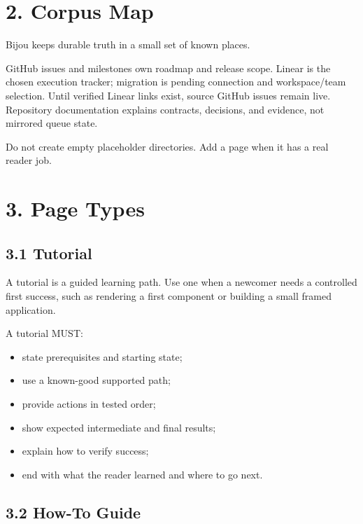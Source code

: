 \section{2. Corpus Map}\label{record-005-corpus-map}

Bijou keeps durable truth in a small set of known places.



GitHub issues and milestones own roadmap and release scope. Linear is the chosen execution tracker; migration is pending connection and workspace/team selection. Until verified Linear links exist, source GitHub issues remain live. Repository documentation explains contracts, decisions, and evidence, not mirrored queue state.

Do not create empty placeholder directories. Add a page when it has a real reader job.

\section{3. Page Types}\label{record-005-page-types}

\subsection{3.1 Tutorial}\label{record-005-tutorial}

A tutorial is a guided learning path. Use one when a newcomer needs a controlled first success, such as rendering a first component or building a small framed application.

A tutorial MUST:

\begin{itemize}
\tightlist
\item
  state prerequisites and starting state;
\item
  use a known-good supported path;
\item
  provide actions in tested order;
\item
  show expected intermediate and final results;
\item
  explain how to verify success;
\item
  end with what the reader learned and where to go next.
\end{itemize}

\subsection{3.2 How-To Guide}\label{record-005-how-to-guide}

